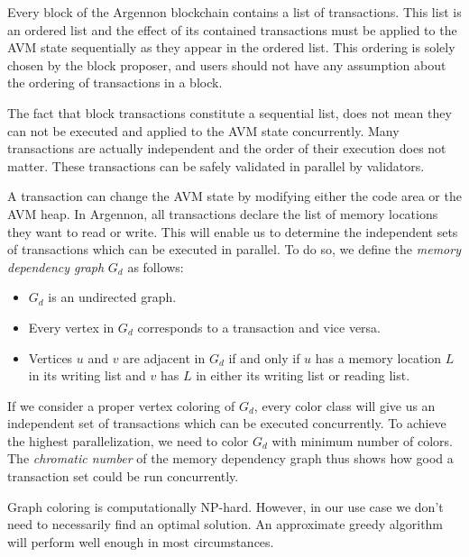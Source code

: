 \documentclass[11pt, A4]{report}
\begin{document}
    Every block of the Argennon blockchain contains a list of transactions. This list is an ordered list and the
    effect of its contained transactions must be applied to the AVM state sequentially as they appear in the ordered
    list. This ordering is solely chosen by the block proposer, and users should not have any assumption about
    the ordering of transactions in a block.

    The fact that block transactions constitute a sequential list, does not mean they can not be executed and applied
    to the AVM state concurrently. Many transactions are actually independent and the order of their execution does not
    matter. These transactions can be safely validated in parallel by validators.

    A transaction can change the AVM state by modifying either the code area or the AVM heap. In Argennon, all
    transactions declare the list of memory locations they want to read or write. This will enable us to determine the
    independent sets of transactions which can be executed in parallel. To do so, we define the \emph{memory dependency
    graph} \(G_d\) as follows:

    \begin{itemize}
        \item \(G_d\) is an undirected graph.
        \item Every vertex in \(G_d\) corresponds to a transaction and vice versa.
        \item Vertices \(u\) and \(v\) are adjacent in \(G_d\) if and only if \(u\) has a memory location \(L\) in its
        writing list and \(v\) has \(L\) in either its writing list or reading list.
    \end{itemize}

    If we consider a proper vertex coloring of \(G_d\), every color class will give us an independent set of
    transactions which can be executed concurrently. To achieve the highest parallelization, we need to color \(G_d\)
    with minimum number of colors. The \emph{chromatic number} of the memory dependency graph thus shows how good a
    transaction set could be run concurrently.

    Graph coloring is computationally NP-hard. However, in our use case we don't need to necessarily find an optimal
    solution. An approximate greedy algorithm will perform well enough in most circumstances.
\end{document}
